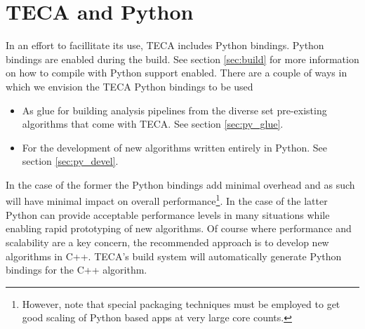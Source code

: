 \documentclass[a4paper,10pt,DIV=12]{scrreprt}
\begin{document}
\chapter{TECA and Python}
In an effort to facillitate its use, TECA includes Python bindings. Python bindings are enabled during the build. See section \ref{sec:build} for more information on how to compile with Python support enabled. There are a couple of ways in which we envision the TECA Python bindings to be used

\noindent\begin{minipage}{0.85\textwidth}
\vspace{2mm}
\begin{itemize}
 \item As glue for building analysis pipelines from the diverse set pre-existing algorithms that come with TECA. See section \ref{sec:py_glue}.
 \item For the development of new algorithms written entirely in Python. See section \ref{sec:py_devel}.
\end{itemize}
\vspace{2mm}
\end{minipage}

\noindent In the case of the former the Python bindings add minimal overhead and as such will have minimal impact on overall performance\footnote{However, note that special packaging techniques must be employed to get good scaling of Python based apps at very large core counts.}. In the case of the latter Python can provide acceptable performance levels in many situations while enabling rapid prototyping of new algorithms. Of course where performance and scalability are a key concern, the recommended approach is to develop new algorithms in C++. TECA's build system will automatically generate Python bindings for the C++ algorithm.
\end{document}
